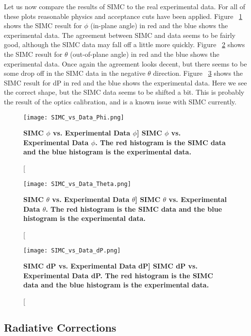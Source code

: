 Let us now compare the results of SIMC to the real experimental data. For all of these plots reasonable physics and acceptance cuts have been applied. Figure ~\ref{fig:simc_phi} shows the SIMC result for $\phi$ (in-plane angle) in red and the blue shows the experimental data. The agreement between SIMC and data seems to be fairly good, although the SIMC data may fall off a little more quickly. Figure ~\ref{fig:simc_theta} shows the SIMC result for $\theta$ (out-of-plane angle) in red and the blue shows the experimental data. Once again the agreement looks decent, but there seems to be some drop off in the SIMC data in the negative $\theta$ direction.  Figure ~\ref{fig:simc_dp} shows the SIMC result for dP in red and the blue shows the experimental data. Here we see the correct shape, but the SIMC data seems to be shifted a bit. This is probably the result of the optics calibration, and is a known issue with SIMC currently.

\begin{figure}[!ht]
\begin{center}
\texttt{[image: SIMC\_vs\_Data\_Phi.png]}
\end{center}
\caption[\bf{SIMC $\phi$ vs. Experimental Data $\phi$}]{
{\bf{SIMC $\phi$ vs. Experimental Data $\phi$.}} The red histogram is the SIMC data and the blue histogram is the experimental data.}
\label{fig:simc_phi}
\end{figure}

\begin{figure}[!ht]
\begin{center}
\texttt{[image: SIMC\_vs\_Data\_Theta.png]}
\end{center}
\caption[\bf{SIMC $\theta$ vs. Experimental Data $\theta$}]{
{\bf{SIMC $\theta$ vs. Experimental Data $\theta$.}} The red histogram is the SIMC data and the blue histogram is the experimental data.}
\label{fig:simc_theta}
\end{figure}

\begin{figure}[!ht]
\begin{center}
\texttt{[image: SIMC\_vs\_Data\_dP.png]}
\end{center}
\caption[\bf{SIMC dP vs. Experimental Data dP}]{
{\bf{SIMC dP vs. Experimental Data dP.}} The red histogram is the SIMC data and the blue histogram is the experimental data.}
\label{fig:simc_dp}
\end{figure}

\subsection{Radiative Corrections}
\label{ssec:rc}

